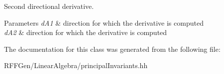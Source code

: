 Second directional derivative. 


\begin{DoxyParams}{Parameters}
{\em d\-A1} & direction for which the derivative is computed \\
\hline
{\em d\-A2} & direction for which the derivative is computed \\
\hline
\end{DoxyParams}


The documentation for this class was generated from the following file\-:\begin{DoxyCompactItemize}
\item 
R\-F\-F\-Gen/\-Linear\-Algebra/principal\-Invariants.\-hh\end{DoxyCompactItemize}
